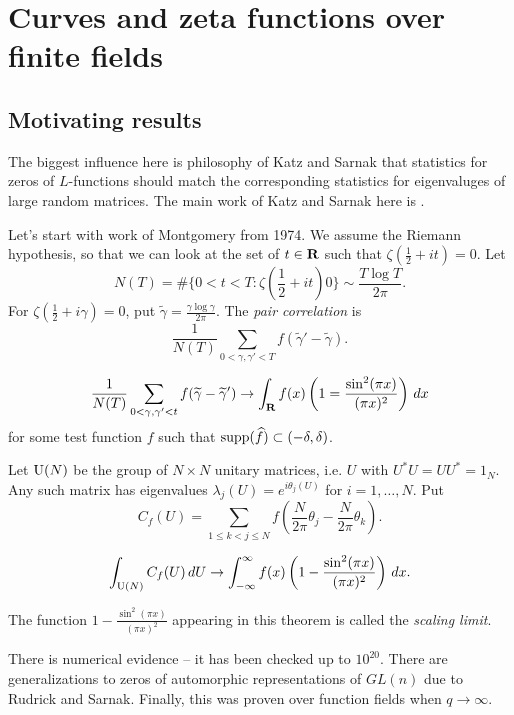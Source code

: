 
\section{Curves and zeta functions over finite fields}





\subsection{Motivating results}

The biggest influence here is philosophy of Katz and Sarnak that statistics 
for zeros of $L$-functions should match the corresponding statistics for 
eigenvaluges of large random matrices. The main work of Katz and Sarnak here 
is \cite{ks99}. 

Let's start with work of Montgomery from 1974. We assume the Riemann hypothesis, 
so that we can look at the set of $t\in \mathbf{R}$ such that 
$\zeta(\frac 1 2+i t)=0$. Let 
\[
  N(T) = \#\{0<t<T:\zeta(\frac 1 2+i t) 0\}  \sim \frac{T\log T}{2\pi} .
\]
For $\zeta(\frac 1 2+i\gamma)=0$, put $\tilde\gamma=\frac{\gamma\log\gamma}{2\pi}$. 
The \emph{pair correlation} is 
\[
  \frac{1}{N(T)} \sum_{0<\gamma,\gamma'<T} f(\tilde\gamma'-\tilde\gamma) .
\]

\begin{theorem}
\[
  \frac{1}{N(T)} \sum_{0<\gamma,\gamma'<t} f(\widetilde\gamma-\widetilde\gamma') \to \int_{\mathbf{R}} f(x)\left(1=\frac{\sin^2(\pi x)}{(\pi x)^2}\right)\, dx 
\]
for some test function $f$ such that 
$\operatorname{supp}(\widehat f) \subset (-\delta,\delta)$. 
\end{theorem}

Let $\operatorname{U}(N)$ be the group of $N\times N$ unitary matrices, i.e. 
$U$ with $U^\ast U = U U^\ast = 1_N$. Any such matrix has eigenvalues 
$\lambda_j(U)=e^{i \theta_j(U)}$ for $i=1,\dots,N$. Put 
\[
  C_f(U) = \sum_{1\leq k < j \leq N}f\left(\frac{N}{2\pi} \theta_j - \frac{N}{2\pi} \theta_k\right) .
\]

\begin{theorem}
\[
  \int_{\operatorname{U}(N)} C_f(U)\, dU \to \int_{-\infty}^\infty f(x)\left(1-\frac{\sin^2(\pi x)}{(\pi x)^2} \right)\, dx .
\]
\end{theorem}
The function $1-\frac{\sin^2(\pi x)}{(\pi x)^2}$ appearing in this theorem is 
called the \emph{scaling limit}. 

There is numerical evidence -- it has been checked up to $10^{20}$. There are 
generalizations to zeros of automorphic representations of $GL(n)$ due to 
Rudrick and Sarnak. Finally, this was proven over function fields 
when $q\to \infty$.





